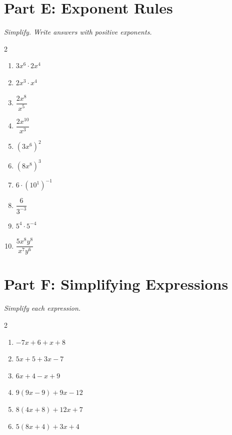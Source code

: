 \documentclass[11pt]{article}
\begin{document}
\section*{Part E: Exponent Rules}
\noindent\textit{Simplify. Write answers with positive exponents.}
\begin{multicols}{2}
\begin{enumerate}
  \item $3x^{6} \cdot 2x^{4}$
  \vspace{1.3cm}
  \item $2x^{3} \cdot x^{4}$
  \vspace{1.3cm}
  \item $\dfrac{2x^{8}}{x^{5}}$
  \vspace{1.3cm}
  \item $\dfrac{2x^{10}}{x^{3}}$
  \vspace{1.3cm}
  \item $(3x^{6})^{2}$
  \vspace{1.3cm}
  \item $(8x^{8})^{3}$
  \vspace{1.3cm}
  \item $6 \cdot (10^{1})^{-1}$
  \vspace{1.3cm}
  \item $\dfrac{6}{3^{-3}}$
  \vspace{1.3cm}
  \item $5^{4} \cdot 5^{-4}$
  \vspace{1.3cm}
  \item $\dfrac{5x^{8}y^{8}}{x^{7}y^{6}}$
  \vspace{1.3cm}
\end{enumerate}
\end{multicols}

\section*{Part F: Simplifying Expressions}
\noindent\textit{Simplify each expression.}
\begin{multicols}{2}
\begin{enumerate}
  \item $-7x + 6 + x + 8$
  \vspace{1.3cm}
  \item $5x + 5 + 3x - 7$
  \vspace{1.3cm}
  \item $6x + 4 - x + 9$
  \vspace{1.3cm}
  \item $9(9x - 9) + 9x - 12$
  \vspace{1.3cm}
  \item $8(4x + 8) + 12x + 7$
  \vspace{1.3cm}
  \item $5(8x + 4) + 3x + 4$
  \vspace{1.3cm}
\end{enumerate}
\end{multicols}
\end{document}
